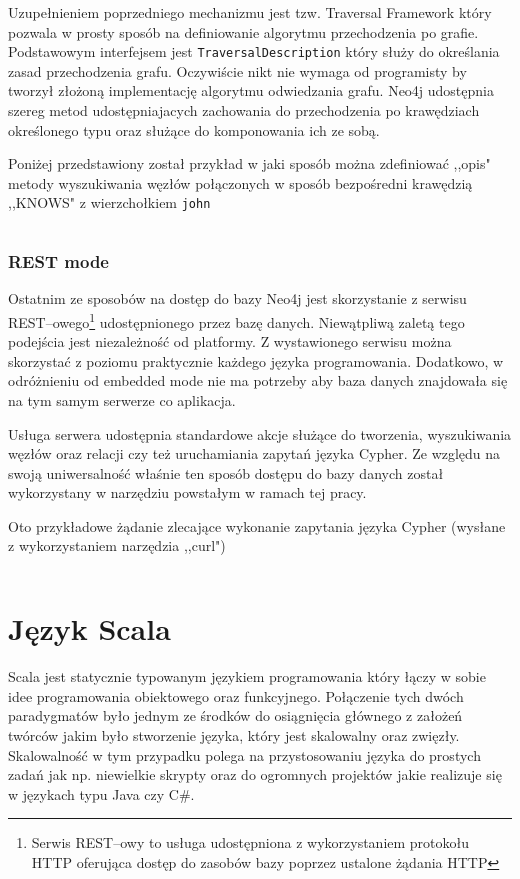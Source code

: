 \documentclass[brudnopis]{xmgr}
\begin{document}
Uzupełnieniem poprzedniego mechanizmu jest tzw. Traversal Framework który pozwala w prosty sposób na definiowanie algorytmu przechodzenia po grafie. Podstawowym interfejsem jest \texttt{TraversalDescription} który służy do określania zasad przechodzenia grafu. Oczywiście nikt nie wymaga od programisty by tworzył złożoną implementację algorytmu odwiedzania grafu. Neo4j udostępnia szereg metod udostępniajacych zachowania do przechodzenia po krawędziach określonego typu oraz służące do komponowania ich ze sobą.

Poniżej przedstawiony został przykład w jaki sposób można zdefiniować ,,opis" metody wyszukiwania węzłów połączonych w sposób bezpośredni krawędzią ,,KNOWS" z wierzchołkiem \texttt{john}

\inputminted{java}{listings/java/neo4j-traversal-api-knows.java}

\subsection{REST mode}

Ostatnim ze sposobów na dostęp do bazy Neo4j jest skorzystanie z serwisu REST--owego\footnote{Serwis REST--owy to usługa udostępniona z wykorzystaniem protokołu HTTP oferująca dostęp do zasobów bazy poprzez ustalone żądania HTTP} udostępnionego przez bazę danych. Niewątpliwą zaletą tego podejścia jest niezależność od platformy. Z wystawionego serwisu można skorzystać z poziomu praktycznie każdego języka programowania. Dodatkowo, w odróżnieniu od embedded mode nie ma potrzeby aby baza danych znajdowała się na tym samym serwerze co aplikacja.

Usługa serwera udostępnia standardowe akcje służące do tworzenia, wyszukiwania węzłów oraz relacji czy też uruchamiania zapytań języka Cypher. Ze względu na swoją uniwersalność właśnie ten sposób dostępu do bazy danych został wykorzystany w narzędziu powstałym w ramach tej pracy.

Oto przykładowe żądanie zlecające wykonanie zapytania języka Cypher (wysłane z wykorzystaniem narzędzia ,,curl")

\inputminted{bash}{listings/bash/neo4j-rest-cypher.sh}

\chapter{Język Scala}

Scala jest statycznie typowanym językiem programowania który łączy w sobie idee programowania obiektowego oraz funkcyjnego. Połączenie tych dwóch paradygmatów było jednym ze środków do osiągnięcia głównego z założeń twórców jakim było stworzenie języka, który jest skalowalny oraz zwięzły. Skalowalność w tym przypadku polega na przystosowaniu języka do prostych zadań jak np. niewielkie skrypty oraz do ogromnych projektów jakie realizuje się w językach typu Java czy C\#.
\end{document}
